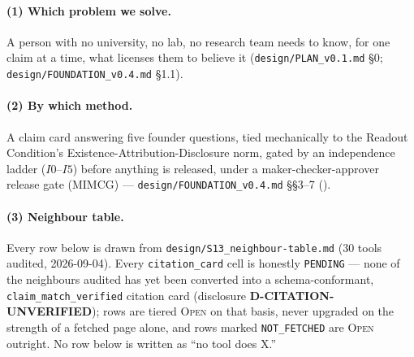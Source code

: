\documentclass[11pt]{article}
\newcommand{\OpenTier}{\textsc{Open}}
\begin{document}
\paragraph{(1) Which problem we solve.} A person with no university, no lab, no research team
needs to know, for one claim at a time, what licenses them to believe it
(\texttt{design/PLAN\_v0.1.md} \S0; \texttt{design/FOUNDATION\_v0.4.md} \S1.1).

\paragraph{(2) By which method.} A claim card answering five founder questions, tied mechanically
to the Readout Condition's Existence-Attribution-Disclosure norm, gated by an independence ladder
(\(I0\)--\(I5\)) before anything is released, under a maker-checker-approver release gate (MIMCG)
--- \texttt{design/FOUNDATION\_v0.4.md} \S\S3--7 ().

\paragraph{(3) Neighbour table.} Every row below is drawn from
\texttt{design/S13\_neighbour-table.md} (30 tools audited, 2026-09-04). Every
\texttt{citation\_card} cell is honestly \texttt{PENDING} --- none of the neighbours audited has
yet been converted into a schema-conformant, \texttt{claim\_match\_verified} citation card
(disclosure \textbf{D-CITATION-UNVERIFIED}); rows are tiered \OpenTier{} on that basis, never
upgraded on the strength of a fetched page alone, and rows marked \texttt{NOT\_FETCHED} are
\OpenTier{} outright. No row below is written as ``no tool does X.''
\end{document}
